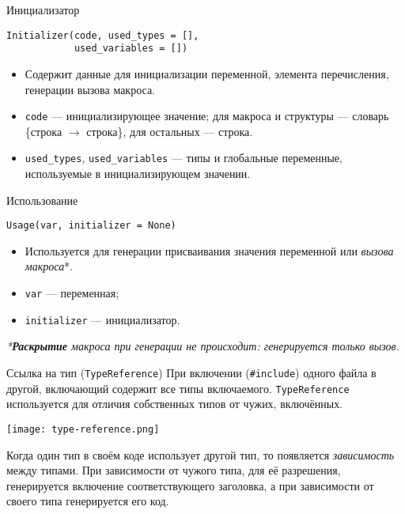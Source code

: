 \documentclass[unicode,hyperref={unicode=true}]{beamer}
\theoremstyle{definition}
\theoremstyle{plain}
\begin{document}
\begin{frame}[fragile]{Инициализатор}
\lstset{language=Python}
\begin{lstlisting}
Initializer(code, used_types = [],
            used_variables = [])
\end{lstlisting}
\vfill
\begin{itemize}
\item Содержит данные для инициализации переменной, элемента перечисления,
    генерации вызова макроса.
\item \texttt{code} --- инициализирующее значение; для макроса и структуры
    --- словарь \{строка \(\rightarrow\) строка\}, для остальных --- строка.
\item \texttt{used\_types}, \texttt{used\_variables} --- типы и глобальные
    переменные, используемые в инициализирующем значении.
\end{itemize}
\end{frame}



\begin{frame}[fragile]{Использование}
\lstset{language=Python}
\begin{lstlisting}
Usage(var, initializer = None)
\end{lstlisting}
\vfill

\begin{itemize}
\item Используется для генерации присваивания значения переменной или
    \textit{вызова макроса}*.
\item \texttt{var} --- переменная;
\item \texttt{initializer} --- инициализатор.
\end{itemize}

\vfill
\textit{*\textbf{Раскрытие} макроса при генерации не происходит: генерируется
только вызов.}
\end{frame}



\begin{frame}[fragile]{Ссылка на тип (\texttt{TypeReference})}
При включении (\texttt{\#include}) одного файла в другой, включающий
содержит все типы включаемого. \texttt{TypeReference} используется для
отличия собственных типов от чужих, включённых.

\vfill

\begin{center}
\texttt{[image: type-reference.png]}
\end{center}

\vfill

Когда один тип в своём коде использует другой тип, то появляется
\textit{зависимость} между типами.
При зависимости от чужого типа, для её разрешения, генерируется включение
соответствующего заголовка, а при зависимости от своего типа
генерируется его код.
\end{frame}
\end{document}
